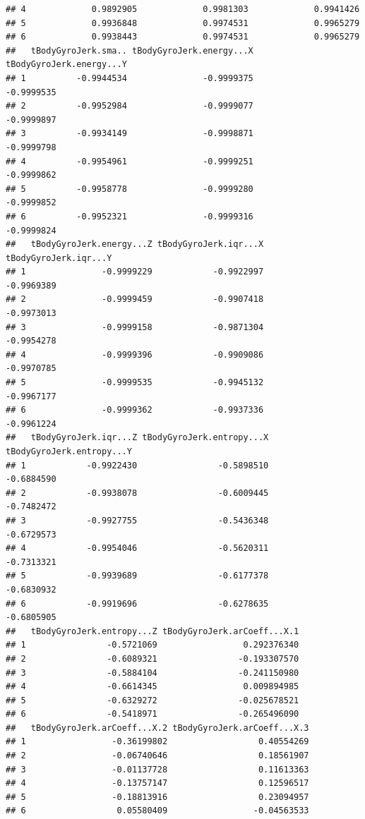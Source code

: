 \documentclass[
]{article}
\begin{document}
\begin{verbatim}
## 4             0.9892905             0.9981303             0.9941426
## 5             0.9936848             0.9974531             0.9965279
## 6             0.9938443             0.9974531             0.9965279
##   tBodyGyroJerk.sma.. tBodyGyroJerk.energy...X tBodyGyroJerk.energy...Y
## 1          -0.9944534               -0.9999375               -0.9999535
## 2          -0.9952984               -0.9999077               -0.9999897
## 3          -0.9934149               -0.9998871               -0.9999798
## 4          -0.9954961               -0.9999251               -0.9999862
## 5          -0.9958778               -0.9999280               -0.9999852
## 6          -0.9952321               -0.9999316               -0.9999824
##   tBodyGyroJerk.energy...Z tBodyGyroJerk.iqr...X tBodyGyroJerk.iqr...Y
## 1               -0.9999229            -0.9922997            -0.9969389
## 2               -0.9999459            -0.9907418            -0.9973013
## 3               -0.9999158            -0.9871304            -0.9954278
## 4               -0.9999396            -0.9909086            -0.9970785
## 5               -0.9999535            -0.9945132            -0.9967177
## 6               -0.9999362            -0.9937336            -0.9961224
##   tBodyGyroJerk.iqr...Z tBodyGyroJerk.entropy...X tBodyGyroJerk.entropy...Y
## 1            -0.9922430                -0.5898510                -0.6884590
## 2            -0.9938078                -0.6009445                -0.7482472
## 3            -0.9927755                -0.5436348                -0.6729573
## 4            -0.9954046                -0.5620311                -0.7313321
## 5            -0.9939689                -0.6177378                -0.6830932
## 6            -0.9919696                -0.6278635                -0.6805905
##   tBodyGyroJerk.entropy...Z tBodyGyroJerk.arCoeff...X.1
## 1                -0.5721069                 0.292376340
## 2                -0.6089321                -0.193307570
## 3                -0.5884104                -0.241150980
## 4                -0.6614345                 0.009894985
## 5                -0.6329272                -0.025678521
## 6                -0.5418971                -0.265496090
##   tBodyGyroJerk.arCoeff...X.2 tBodyGyroJerk.arCoeff...X.3
## 1                 -0.36199802                  0.40554269
## 2                 -0.06740646                  0.18561907
## 3                 -0.01137728                  0.11613363
## 4                 -0.13757147                  0.12596517
## 5                 -0.18813916                  0.23094957
## 6                  0.05580409                 -0.04563533

\end{verbatim}
\end{document}
